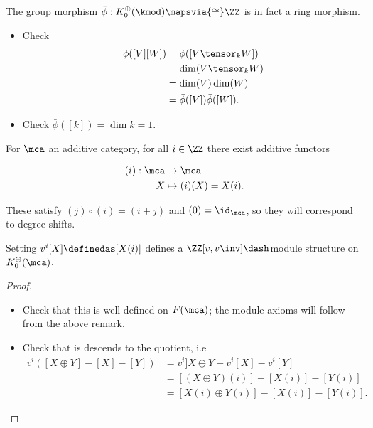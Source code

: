 \begin{example}

The group morphism \(\bar \phi: K_0^\oplus(\kmod) \mapsvia{\cong} \ZZ\)
is in fact a ring morphism.

\begin{itemize}
\tightlist
\item
  Check
  \begin{align*}
  \bar \phi([V][W]) 
  &= \bar\phi([V\tensor_k W]) \\
  &= \dim(V\tensor_k W) \\
  &= \dim(V) \dim(W) \\
  &= \bar\phi([V]) \bar\phi([W])
  .\end{align*}
\item
  Check \(\bar\phi([k]) = \dim k = 1\).
\end{itemize}

For \(\mca\) an additive category, for all \(i\in \ZZ\) there exist
additive functors

\begin{align*}
(i): \mca &\to \mca \\
X &\mapsto (i)(X) = X(i)
.\end{align*}

\end{example}

\begin{remark}

These satisfy \((j) \circ (i) = (i+j)\) and \((0) = \id_\mca\), so they
will correspond to degree shifts.

\end{remark}

\begin{proposition}[?]

Setting \(v^i[X] \definedas [X(i)]\) defines a
\(\ZZ[v, v\inv]\dash\)module structure on \(K_0^\oplus(\mca)\).

\end{proposition}

\begin{proof}

\hfill

\begin{itemize}
\item
  Check that this is well-defined on \(F(\mca)\); the module axioms will
  follow from the above remark.
\item
  Check that is descends to the quotient, i.e
  \begin{align*}
  v^i([X\oplus Y] -[X] - [Y])
  &= v^i]X\oplus Y - v^i[X] - v^i [Y] \\
  &= [(X\oplus Y)(i)] - [X(i)] - [Y(i)] \\
  &= [X(i)\oplus Y(i)] - [X(i)] - [Y(i)]
  .\end{align*}
\end{itemize}

\end{proof}

